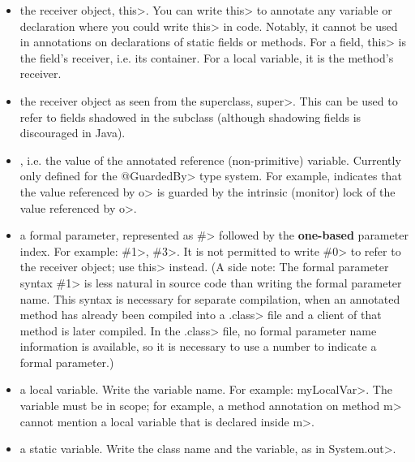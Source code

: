\begin{itemize}
\item
  the receiver object, \<this>.  You can write \<this> to annotate any
  variable or declaration where you could write \<this> in code.
  Notably, it cannot be used in annotations on declarations of
  static fields or methods.  For a field, \<this> is the field's
  receiver, i.e. its container.  For a local variable, it is the
  method's receiver.

\item
  the receiver object as seen from the superclass, \<super>.  This can be used
  to refer to fields shadowed in the subclass (although shadowing fields is
  discouraged in Java).

\item
  , i.e. the value of the annotated reference (non-primitive) variable.
  Currently only defined for the \<@GuardedBy> type system.
  For example,  indicates that the value
  referenced by \<o> is guarded by the intrinsic (monitor) lock of the value
  referenced by \<o>.

\item
  a formal parameter, represented as \<\#> followed by the \textbf{one-based} parameter
  index.  For example: \<\#1>, \<\#3>.  It is not permitted to write \<\#0> to
  refer to the receiver object; use \<this> instead.  (A side note:
  The formal parameter syntax \<\#1> is less natural in source code
  than writing the formal parameter name.  This syntax is necessary for
  separate compilation, when an annotated method has already been compiled
  into a \<.class> file and a client of that method is later compiled.
  In the \<.class> file, no formal parameter name information is available,
  so it is necessary to use a number to indicate a formal parameter.)

\item
  a local variable.  Write the variable name.  For example: \<myLocalVar>.
  The variable must be in scope; for example, a method annotation on method
  \<m> cannot mention a local variable that is declared inside \<m>.

\item
  a static variable.  Write the class name and the variable, as in
  \<System.out>.


\end{itemize}
